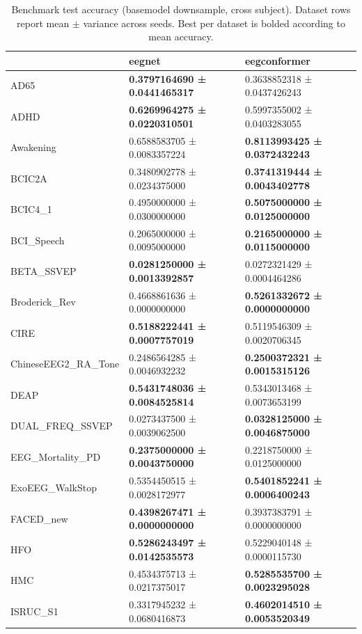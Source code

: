 \begin{table}[htbp]
\caption{Benchmark test accuracy (basemodel downsample, cross subject). Dataset rows report mean $\pm$ variance across seeds. Best per dataset is bolded according to mean accuracy.}
\label{tab:benchmark_results_basemodel_downsample_cross_subject}
\begin{tabular}{lll}
\toprule
 & eegnet & eegconformer \\
\midrule
AD65 & \bfseries 0.3797164690 ± 0.0441465317 & 0.3638852318 ± 0.0437426243 \\
ADHD & \bfseries 0.6269964275 ± 0.0220310501 & 0.5997355002 ± 0.0403283055 \\
Awakening & 0.6588583705 ± 0.0083357224 & \bfseries 0.8113993425 ± 0.0372432243 \\
BCIC2A & 0.3480902778 ± 0.0234375000 & \bfseries 0.3741319444 ± 0.0043402778 \\
BCIC4_1 & 0.4950000000 ± 0.0300000000 & \bfseries 0.5075000000 ± 0.0125000000 \\
BCI_Speech & 0.2065000000 ± 0.0095000000 & \bfseries 0.2165000000 ± 0.0115000000 \\
BETA_SSVEP & \bfseries 0.0281250000 ± 0.0013392857 & 0.0272321429 ± 0.0004464286 \\
Broderick_Rev & 0.4668861636 ± 0.0000000000 & \bfseries 0.5261332672 ± 0.0000000000 \\
CIRE & \bfseries 0.5188222441 ± 0.0007757019 & 0.5119546309 ± 0.0020706345 \\
ChineseEEG2_RA_Tone & 0.2486564285 ± 0.0046932232 & \bfseries 0.2500372321 ± 0.0015315126 \\
DEAP & \bfseries 0.5431748036 ± 0.0084525814 & 0.5343013468 ± 0.0073653199 \\
DUAL_FREQ_SSVEP & 0.0273437500 ± 0.0039062500 & \bfseries 0.0328125000 ± 0.0046875000 \\
EEG_Mortality_PD & \bfseries 0.2375000000 ± 0.0043750000 & 0.2218750000 ± 0.0125000000 \\
ExoEEG_WalkStop & 0.5354450515 ± 0.0028172977 & \bfseries 0.5401852241 ± 0.0006400243 \\
FACED_new & \bfseries 0.4398267471 ± 0.0000000000 & 0.3937383791 ± 0.0000000000 \\
HFO & \bfseries 0.5286243497 ± 0.0142535573 & 0.5229040148 ± 0.0000115730 \\
HMC & 0.4534375713 ± 0.0217375017 & \bfseries 0.5285535700 ± 0.0023295028 \\
ISRUC_S1 & 0.3317945232 ± 0.0680416873 & \bfseries 0.4602014510 ± 0.0053520349 \\

\end{tabular}
\end{table}
